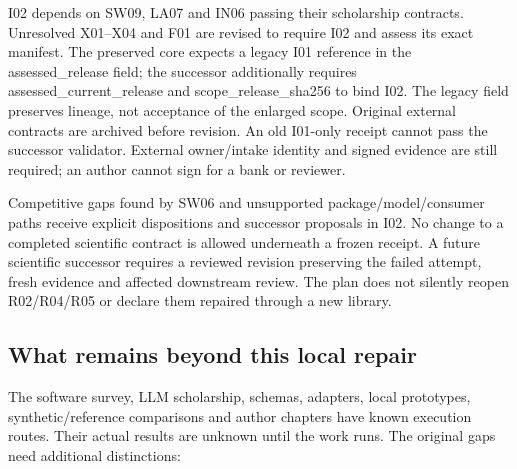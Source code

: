 \documentclass[
  11pt,
  a4paper,
]{article}
\begin{document}
I02 depends on SW09, LA07 and IN06 passing their scholarship contracts.
Unresolved X01--X04 and F01 are revised to require I02 and assess its
exact manifest. The preserved core expects a legacy I01 reference in the
assessed\_release field; the successor additionally requires
assessed\_current\_release and scope\_release\_sha256 to bind I02. The
legacy field preserves lineage, not acceptance of the enlarged scope.
Original external contracts are archived before revision. An old
I01-only receipt cannot pass the successor validator. External
owner/intake identity and signed evidence are still required; an author
cannot sign for a bank or reviewer.

Competitive gaps found by SW06 and unsupported package/model/consumer
paths receive explicit dispositions and successor proposals in I02. No
change to a completed scientific contract is allowed underneath a frozen
receipt. A future scientific successor requires a reviewed revision
preserving the failed attempt, fresh evidence and affected downstream
review. The plan does not silently reopen R02/R04/R05 or declare them
repaired through a new library.

\hypertarget{what-remains-beyond-this-local-repair}{%
\subsection{What remains beyond this local
repair}\label{what-remains-beyond-this-local-repair}}

The software survey, LLM scholarship, schemas, adapters, local
prototypes, synthetic/reference comparisons and author chapters have
known execution routes. Their actual results are unknown until the work
runs. The original gaps need additional distinctions:
\end{document}
